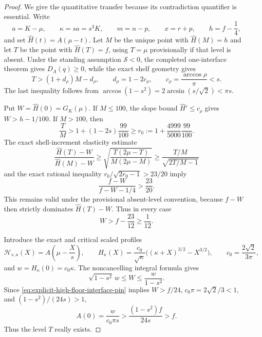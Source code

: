 \documentclass[11pt]{article}
\theoremstyle{remark}
\begin{document}
\begin{proof}
We give the quantitative transfer because its contradiction quantifier is
essential.  Write
\[
 a=K-\mu,\qquad \kappa=s a=s^3K,\qquad
 m=n-p,\qquad x=r+p,\qquad h=f-\frac14,
\]
and set $\widehat H(t)=A(\mu-t)$.  Let $M$ be the unique point with
$\widehat H(M)=h$ and let $T$ be the point with
$\widehat H(T)=f$, using $T=\mu$ provisionally if that level is absent.
Under the standing assumption $\mathcal S<0$, the completed
one-interface theorem gives $D_A(q)\geq0$, while the exact shelf geometry
gives
\begin{equation}
 T>(1+d_\rho)M-d_\rho,\qquad
 d_\rho=1-2c_\rho,\qquad
 c_\rho=\frac{\arccos\rho}{\pi}<s.
 \label{eq:explicit-high-floor-prefix-geometry}
\end{equation}
The last inequality follows from
$\arccos(1-s^2)=2\arcsin(s/\sqrt2)<\pi s$.

Put $W=\widehat H(0)=G_K(\mu)$.  If $M\leq100$, the slope bound
$\widehat H'\leq c_\rho$ gives $W>h-1/100$.  If $M>100$, then
\[
 \frac TM>
 1+(1-2s)\frac{99}{100}\geq
 r_0:=1+\frac{4999}{5000}\frac{99}{100}.
\]
The exact shell-increment elasticity estimate
\[
 \frac{\widehat H(T)-W}{\widehat H(M)-W}
 \geq\sqrt{\frac{T(2\mu-T)}{M(2\mu-M)}}
 \geq\frac{T/M}{\sqrt{2T/M-1}}
\]
and the exact rational inequality
$r_0/\sqrt{2r_0-1}>23/20$ imply
\[
 \frac{f-W}{f-W-1/4}>\frac{23}{20}.
\]
This remains valid under the provisional absent-level convention, because
$f-W$ then strictly dominates $\widehat H(T)-W$.  Thus in every case
\begin{equation}
 \boxed{W>f-\frac{23}{12}\geq\frac1{12}.}
 \label{eq:explicit-high-floor-interface-pin}
\end{equation}

Introduce the exact and critical scaled profiles
\[
 \mathcal H_{s,\kappa}(X)=A\left(\mu-\frac Xs\right),\qquad
 H_\kappa(X)=\frac{c_0}{\sqrt\kappa}
 \bigl((\kappa+X)^{3/2}-X^{3/2}\bigr),\qquad
 c_0=\frac{2\sqrt2}{3\pi},
\]
and $w=H_\kappa(0)=c_0\kappa$.  The noncancelling integral formula gives
\begin{equation}
 \sqrt{1-s^2}\,w\leq W\leq\frac{w}{1-s^2}.
 \label{eq:explicit-high-floor-origin-comparison}
\end{equation}
Since \eqref{eq:explicit-high-floor-interface-pin} implies $W>f/24$,
$c_0\pi=2\sqrt2/3<1$, and $(1-s^2)/(24s)>1$,
\[
 A(0)=\frac{w}{c_0\pi s}>
 \frac{(1-s^2)f}{24s}>f.
\]
Thus the level $T$ really exists.


\end{proof}
\end{document}
